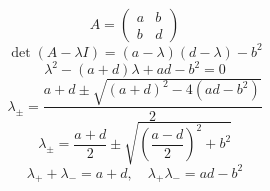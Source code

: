 \documentclass{article}
\begin{document}
\[
A=\begin{pmatrix}a&b\\b&d\end{pmatrix}
\]
\[
\det(A-\lambda I)=(a-\lambda)(d-\lambda)-b^2
\]
\[
\lambda^2-(a+d)\lambda+ad-b^2=0
\]
\[
\lambda_{\pm}=\frac{a+d\pm\sqrt{(a+d)^2-4(ad-b^2)}}{2}
\]
\[
\lambda_{\pm}=\frac{a+d}{2}\pm\sqrt{\left(\frac{a-d}{2}\right)^2+b^2}
\]
\[
\lambda_++\lambda_-=a+d,\quad\lambda_+\lambda_-=ad-b^2
\]
\end{document}

